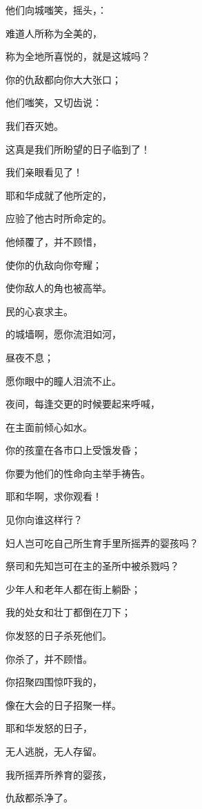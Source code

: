 {\par }{\Q 他们向{}城嗤笑，摇头，{}：
\par }{\Q 难道人所称为全美的，
\par }{\Q 称为全地所喜悦的，就是这城吗？
\par }{\BB \par }{\Q {}你的仇敌都向你大大张口；
\par }{\Q 他们嗤笑，又切齿说：
\par }{\Q 我们吞灭她。
\par }{\Q 这真是我们所盼望的日子临到了！
\par }{\Q 我们亲眼看见了！
\par }{\BB \par }{\Q {}耶和华成就了他所定的，
\par }{\Q 应验了他古时所命定的。
\par }{\Q 他倾覆了，并不顾惜，
\par }{\Q 使你的仇敌向你夸耀；
\par }{\Q 使你敌人的角也被高举。
\par }{\BB \par }{\Q {}民的心哀求主。
\par }{的城墙啊，愿你流泪如河，
\par }{\Q 昼夜不息；
\par }{\Q 愿你眼中的瞳人泪流不止。
\par }{\BB \par }{\Q {}夜间，每逢交更的时候要起来呼喊，
\par }{\Q 在主面前倾心如水。
\par }{\Q 你的孩童在各市口上受饿发昏；
\par }{\Q 你要为他们的性命向主举手祷告。
\par }{\BB \par }{\Q {}耶和华啊，求你观看！
\par }{\Q 见你向谁这样行？
\par }{\Q 妇人岂可吃自己所生育手里所摇弄的婴孩吗？
\par }{\Q 祭司和先知岂可在主的圣所中被杀戮吗？
\par }{\BB \par }{\Q {}少年人和老年人都在街上躺卧；
\par }{\Q 我的处女和壮丁都倒在刀下；
\par }{\Q 你发怒的日子杀死他们。
\par }{\Q 你杀了，并不顾惜。
\par }{\BB \par }{\Q {}你招聚四围惊吓我的，
\par }{\Q 像在大会的日子招聚{}一样。
\par }{\Q 耶和华发怒的日子，
\par }{\Q 无人逃脱，无人存留。
\par }{\Q 我所摇弄所养育的婴孩，
\par }{\Q 仇敌都杀净了。

}
